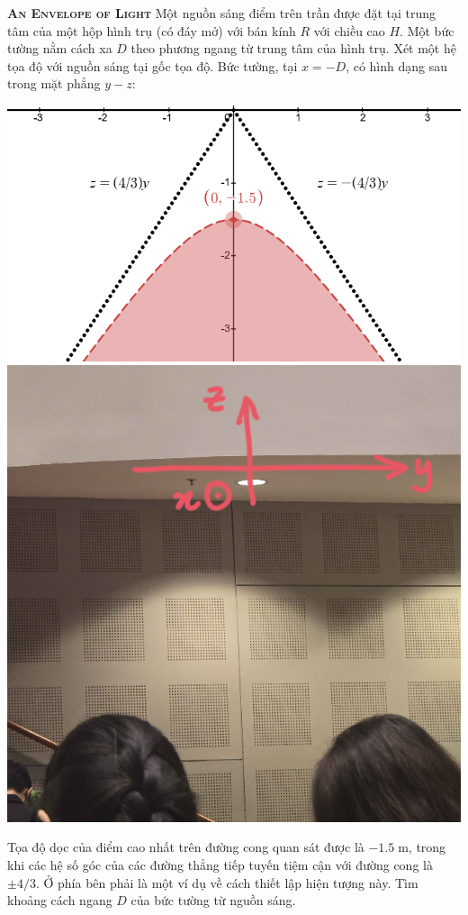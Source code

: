 

\begin{problem}
	{\textbf{\textsc{An Envelope of Light}}} 
	Một nguồn sáng điểm trên trần được đặt tại trung tâm của một hộp hình trụ (có đáy mở) với bán kính $R$ với chiều cao $H$. Một bức tường nằm cách xa $D$ theo phương ngang từ trung tâm của hình trụ. Xét một hệ tọa độ với nguồn sáng tại gốc tọa độ. Bức tường, tại $x=-D$, có hình dạng sau trong mặt phẳng $y-z$:
	
	\begin{center}
		\includegraphics[height=0.3\textwidth]{problems/figures/lightConeGraph.png}
		\hspace{2em}
		\includegraphics[height=0.3\textwidth]{problems/figures/lightConeHyperbola.png}
	\end{center}
	
	Tọa độ dọc của điểm cao nhất trên đường cong quan sát được là $-1.5\;\mathrm{m}$, trong khi các hệ số góc của các đường thẳng tiếp tuyến tiệm cận với đường cong là $\pm 4/3$. Ở phía bên phải là một ví dụ về cách thiết lập hiện tượng này. Tìm khoảng cách ngang $D$ của bức tường từ nguồn sáng.
\end{problem}
